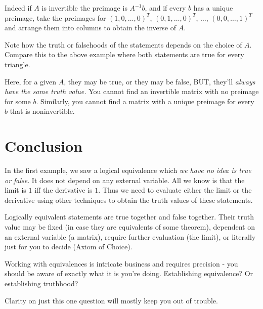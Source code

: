 Indeed if $A$ is invertible the preimage is $A^{-1}b$, and if every $b$ has a unique preimage, take the preimages for $(1, 0, \ldots, 0)^T$, $(0, 1, \ldots, 0)^T$, $\ldots$, $(0, 0, \ldots, 1)^T$ and arrange them into columns to obtain the inverse of $A$.

Note how the truth or falsehoods of the statements depends on the choice of $A$. Compare this to the above example where both statements are true for every triangle.

Here, for a given $A$, they may be true, or they may be false, BUT, they'll \textit{always have the same truth value.} You cannot find an invertible matrix with no preimage for some $b$. Similarly, you cannot find a matrix with a unique preimage for every $b$ that is noninvertible.

\section*{Conclusion}
In the first example, we saw a logical equivalence which \textit{we have no idea is true or false}. It does not depend on any external variable. All we know is that the limit is $1$ iff the derivative is $1$. Thus we need to evaluate either the limit or the derivative using other techniques to obtain the truth values of these statements.

Logically equivalent statements are true together and false together. Their truth value may be fixed (in case they are equivalents of some theorem), dependent on an external variable (a matrix), require further evaluation (the limit), or literally just for you to decide (Axiom of Choice).

Working with equivalences is intricate business and requires precision - you should be aware of exactly what it is you're doing. Establishing equivalence? Or establishing truthhood?

Clarity on just this one question will mostly keep you out of trouble.
